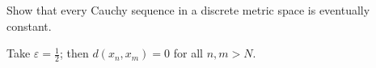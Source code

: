 \label{prob:cauchy}
Show that every Cauchy sequence in a discrete metric space is eventually constant.
\begin{solution}
Take $\varepsilon = \tfrac12$; then $d(x_n, x_m) = 0$ for all $n, m > N$.
\end{solution}
